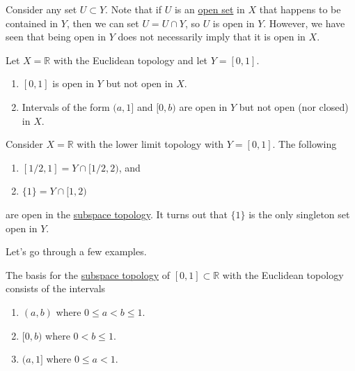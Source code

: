   Consider any set $U \subset Y$. Note that if $U$ is an \hyperref[def:open-set]{open set} in $X$ that happens to be contained in $Y$, then we can set $U = U \cap Y$, so $U$ is open in $Y$. However, we have seen that being open in $Y$ does not necessarily imply that it is open in $X$. 

  \begin{example}
    \label{ex:non-open-sets-may-be-open-in-subspace}
    Let $X = \mathbb{R}$ with the Euclidean topology and let $Y = [0, 1]$. 
    \begin{enumerate}
      \item $[0, 1]$ is open in $Y$ but not open in $X$. 
      \item Intervals of the form $(a, 1]$ and $[0, b)$ are open in $Y$ but not open (nor closed) in $X$. 
    \end{enumerate}
  \end{example} 

  \begin{example}
    \label{ex:singleton-sets-in-subspace-topologies}
    Consider $X = \mathbb{R}$ with the lower limit topology with $Y = [0, 1]$. The following 
    \begin{enumerate}
      \item $[1/2, 1] = Y \cap [1/2, 2)$, and 
      \item $\{1\} = Y \cap [1, 2)$
    \end{enumerate}
    are open in the \hyperref[def:subspace-topology]{subspace topology}. It turns out that $\{1\}$ is the only singleton set open in $Y$. 
  \end{example}

  Let's go through a few examples. 

  \begin{example}
    \label{ex:closed-unit-interval-in-r}
    The basis for the \hyperref[def:subspace-topology]{subspace topology} of $[0, 1] \subset \mathbb{R}$ with the Euclidean topology consists of the intervals 
    \begin{enumerate}
      \item $(a, b)$ where $0 \leq a < b \leq 1$. 
      \item $[0, b)$ where $0 < b \leq 1$. 
      \item $(a, 1]$ where $0 \leq a < 1$. 
    \end{enumerate}
  \end{example} 

